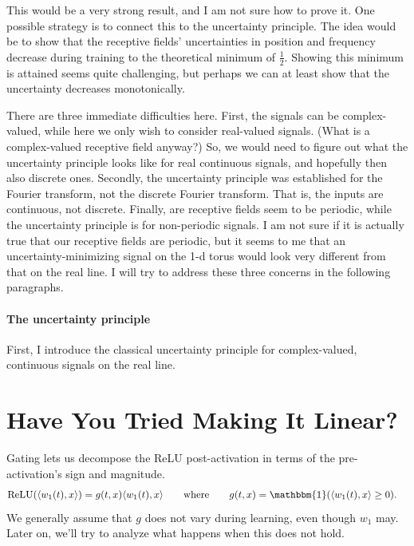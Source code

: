 \documentclass{article}
\begin{document}
This would be a very strong result, and I am not sure how to prove it.
One possible strategy is to connect this to the uncertainty principle.
The idea would be to show that the receptive fields' uncertainties in position and frequency decrease during training to the theoretical minimum of $\frac{1}{2}$.
Showing this minimum is attained seems quite challenging, but perhaps we can at least show that the uncertainty decreases monotonically.

There are three immediate difficulties here.
First, the signals can be complex-valued, while here we only wish to consider real-valued signals.
(What is a complex-valued receptive field anyway?)
So, we would need to figure out what the uncertainty principle looks like for real continuous signals, and hopefully then also discrete ones.
Secondly, the uncertainty principle was established for the Fourier transform, not the discrete Fourier transform.
That is, the inputs are continuous, not discrete.
Finally, are receptive fields seem to be periodic, while the uncertainty principle is for non-periodic signals.
I am not sure if it is actually true that our receptive fields are periodic, but it seems to me that an uncertainty-minimizing signal on the 1-d torus would look very different from that on the real line.
I will try to address these three concerns in the following paragraphs.

\paragraph*{The uncertainty principle}
First, I introduce the classical uncertainty principle for complex-valued, continuous signals on the real line.




\section{Have You Tried Making It Linear?}

Gating lets us decompose the ReLU post-activation in terms of the pre-activation's sign and magnitude.
\begin{align}
  \text{ReLU}(\langle w_1(t), x \rangle)
  &= g(t, x) \langle w_1(t), x \rangle \qquad \text{where} \qquad g(t, x) = \mathbbm{1}( \langle w_1(t), x \rangle \geq 0 ). \label{eq:relu_gating}
\end{align}
We generally assume that $g$ does not vary during learning, even though $w_1$ may.
Later on, we'll try to analyze what happens when this does not hold.
\end{document}
